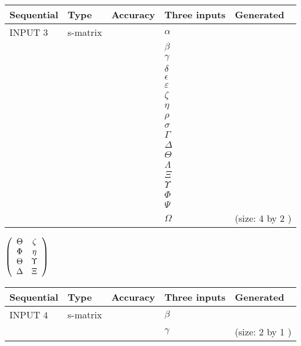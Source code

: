 \documentclass[12pt]{article}
\begin{document}
  
\noindent\begin{tabular}{|l|l|l|l|l|}
\hline
 Sequential & Type & Accuracy & Three inputs & Generated \\ 
\hline
 
 
  INPUT $            3 $ & s-matrix & & 
 $  \alpha $ & 
  \\
  & & & 
 $  \beta $ & 
  \\
  & & & 
 $  \gamma $ & 
  \\
  & & & 
 $  \delta $ & 
  \\
  & & & 
 $  \epsilon $ & 
  \\
  & & & 
 $  \varepsilon $ & 
  \\
  & & & 
 $                     \zeta $ & 
  \\
  & & & 
 $  \eta $ & 
  \\
  & & & 
 $  \rho $ & 
  \\
  & & & 
 $  \sigma $ & 
  \\
  & & & 
 $  \Gamma $ & 
  \\
  & & & 
 $  \Delta $ & 
  \\
  & & & 
 $  \Theta $ & 
  \\
  & & & 
 $  \Lambda $ & 
  \\
  & & & 
 $                     \Xi $ & 
  \\
  & & & 
 $  \Upsilon $ & 
  \\
  & & & 
 $  \Phi $ & 
  \\
  & & & 
 $  \Psi $ & 
  \\
  & & & 
 $  \Omega $ & 
  (size:            4  by            2 )
 \\  \hline  
 \end{tabular}
   
   
 $  \left( \begin{array}
 {
 c
 c
 }
 \Theta & 
                    \zeta \\ 
 \Phi & 
 \eta \\ 
 \Theta & 
 \Upsilon \\ 
 \Delta & 
                    \Xi
 \end{array} \right) $ 
  
  
\noindent\begin{tabular}{|l|l|l|l|l|}
\hline
 Sequential & Type & Accuracy & Three inputs & Generated \\ 
\hline
 
 
  INPUT $            4 $ & s-matrix & & 
 $  \beta $ & 
  \\
  & & & 
 $  \gamma $ & 
  (size:            2  by            1 )
 \\  \hline  
 \end{tabular}
   
\end{document}
